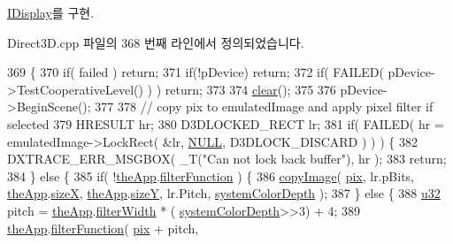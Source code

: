 \mbox{\hyperlink{class_i_display_af61c440b97da313a502e86346a729b03}{I\+Display}}를 구현.



Direct3\+D.\+cpp 파일의 368 번째 라인에서 정의되었습니다.


\begin{DoxyCode}
369 \{
370     \textcolor{keywordflow}{if}( failed ) \textcolor{keywordflow}{return};
371     \textcolor{keywordflow}{if}(!pDevice) \textcolor{keywordflow}{return};
372     \textcolor{keywordflow}{if}( FAILED( pDevice->TestCooperativeLevel() ) ) \textcolor{keywordflow}{return};
373     
374     \mbox{\hyperlink{class_direct3_d_display_a67b8e31e5bb726cb82efbfb0be90935f}{clear}}();
375     
376     pDevice->BeginScene();
377     
378     \textcolor{comment}{// copy pix to emulatedImage and apply pixel filter if selected}
379     HRESULT hr;
380     D3DLOCKED\_RECT lr;
381     \textcolor{keywordflow}{if}( FAILED( hr = emulatedImage->LockRect( &lr, \mbox{\hyperlink{getopt1_8c_a070d2ce7b6bb7e5c05602aa8c308d0c4}{NULL}}, D3DLOCK\_DISCARD ) ) ) \{
382         DXTRACE\_ERR\_MSGBOX( \_T(\textcolor{stringliteral}{"Can not lock back buffer"}), hr );
383         \textcolor{keywordflow}{return};
384     \} \textcolor{keywordflow}{else} \{
385         \textcolor{keywordflow}{if}( !\mbox{\hyperlink{_v_b_a_8cpp_a8095a9d06b37a7efe3723f3218ad8fb3}{theApp}}.\mbox{\hyperlink{class_v_b_a_a8267ca41247e8d752776b57a3f8af011}{filterFunction}} ) \{
386             \mbox{\hyperlink{display_8cpp_af067251fbfac32e8e783daa9587befd8}{copyImage}}( \mbox{\hyperlink{_g_b_8cpp_a5ee6554b606dcde59ac92578b33776d0}{pix}}, lr.pBits, \mbox{\hyperlink{_v_b_a_8cpp_a8095a9d06b37a7efe3723f3218ad8fb3}{theApp}}.\mbox{\hyperlink{class_v_b_a_a7b711f29fd088fa6611d240277a24e9e}{sizeX}}, 
      \mbox{\hyperlink{_v_b_a_8cpp_a8095a9d06b37a7efe3723f3218ad8fb3}{theApp}}.\mbox{\hyperlink{class_v_b_a_acb2e7221985fd0355f105cd1ec42e52e}{sizeY}}, lr.Pitch, \mbox{\hyperlink{system_8cpp_adaf454a4617a00b5cfed14c203ab6efa}{systemColorDepth}} );
387         \} \textcolor{keywordflow}{else} \{
388             \mbox{\hyperlink{_system_8h_a10e94b422ef0c20dcdec20d31a1f5049}{u32}} pitch = \mbox{\hyperlink{_v_b_a_8cpp_a8095a9d06b37a7efe3723f3218ad8fb3}{theApp}}.\mbox{\hyperlink{class_v_b_a_a1ae8b3a4ed9fd2a3783868ae5d38c3bc}{filterWidth}} * (
      \mbox{\hyperlink{system_8cpp_adaf454a4617a00b5cfed14c203ab6efa}{systemColorDepth}}>>3) + 4;
389             \mbox{\hyperlink{_v_b_a_8cpp_a8095a9d06b37a7efe3723f3218ad8fb3}{theApp}}.\mbox{\hyperlink{class_v_b_a_a8267ca41247e8d752776b57a3f8af011}{filterFunction}}( \mbox{\hyperlink{_g_b_8cpp_a5ee6554b606dcde59ac92578b33776d0}{pix}} + pitch,

\end{DoxyCode}
